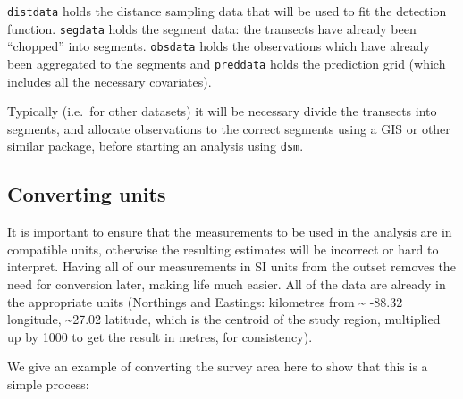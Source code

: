 \documentclass[]{article}
\newenvironment{Shaded}{}{}
\newcommand{\KeywordTok}[1]{\textcolor[rgb]{0.00,0.44,0.13}{\textbf{{#1}}}}
\newcommand{\DataTypeTok}[1]{\textcolor[rgb]{0.56,0.13,0.00}{{#1}}}
\newcommand{\DecValTok}[1]{\textcolor[rgb]{0.25,0.63,0.44}{{#1}}}
\newcommand{\FloatTok}[1]{\textcolor[rgb]{0.25,0.63,0.44}{{#1}}}
\newcommand{\StringTok}[1]{\textcolor[rgb]{0.25,0.44,0.63}{{#1}}}
\newcommand{\CommentTok}[1]{\textcolor[rgb]{0.38,0.63,0.69}{\textit{{#1}}}}
\newcommand{\NormalTok}[1]{{#1}}
\begin{document}
\texttt{distdata} holds the distance sampling data that will be used to
fit the detection function. \texttt{segdata} holds the segment data: the
transects have already been ``chopped'' into segments. \texttt{obsdata}
holds the observations which have already been aggregated to the
segments and \texttt{preddata} holds the prediction grid (which includes
all the necessary covariates).

Typically (i.e.~for other datasets) it will be necessary divide the
transects into segments, and allocate observations to the correct
segments using a GIS or other similar package, before starting an
analysis using \texttt{dsm}.

\subsection{Converting units}\label{converting-units}

It is important to ensure that the measurements to be used in the
analysis are in compatible units, otherwise the resulting estimates will
be incorrect or hard to interpret. Having all of our measurements in SI
units from the outset removes the need for conversion later, making life
much easier. All of the data are already in the appropriate units
(Northings and Eastings: kilometres from \textasciitilde{} -88.32
longitude, \textasciitilde{}27.02 latitude, which is the centroid of the
study region, multiplied up by 1000 to get the result in metres, for
consistency).

We give an example of converting the survey area here to show that this
is a simple process:

\begin{Shaded}
\end{Shaded}
\end{document}

